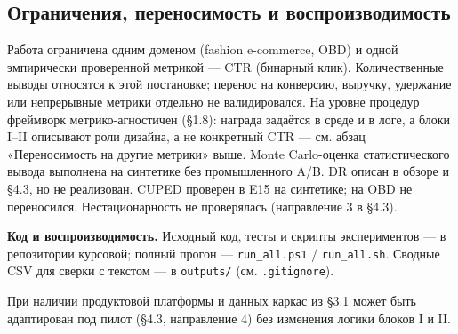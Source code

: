 \subsection{Ограничения, переносимость и воспроизводимость}\label{ux43eux433ux440ux430ux43dux438ux447ux435ux43dux438ux44f-ux43fux435ux440ux435ux43dux43eux441ux438ux43cux43eux441ux442ux44c-ux438-ux432ux43eux441ux43fux440ux43eux438ux437ux432ux43eux434ux438ux43cux43eux441ux442ux44c}

Работа ограничена одним доменом (fashion e-commerce, OBD) и одной эмпирически проверенной метрикой --- CTR (бинарный клик). Количественные выводы относятся к этой постановке; перенос на конверсию, выручку, удержание или непрерывные метрики отдельно не валидировался. На уровне процедур фреймворк метрико-агностичен (§1.8): награда задаётся в среде и в логе, а блоки I--II описывают роли дизайна, а не конкретный CTR --- см. абзац «Переносимость на другие метрики» выше. Monte Carlo-оценка статистического вывода выполнена на синтетике без промышленного A/B. DR \cite{ref27} описан в обзоре и §4.3, но не реализован. CUPED \cite{ref7} проверен в E15 на синтетике; на OBD не переносился. Нестационарность не проверялась (направление 3 в §4.3).

\textbf{Код и воспроизводимость.} Исходный код, тесты и скрипты экспериментов --- в репозитории курсовой; полный прогон --- \texttt{run\_all.ps1} / \texttt{run\_all.sh}. Сводные CSV для сверки с текстом --- в \texttt{outputs/} (см. \texttt{.gitignore}).

При наличии продуктовой платформы и данных каркас из §3.1 может быть адаптирован под пилот (§4.3, направление 4) без изменения логики блоков I и II.
